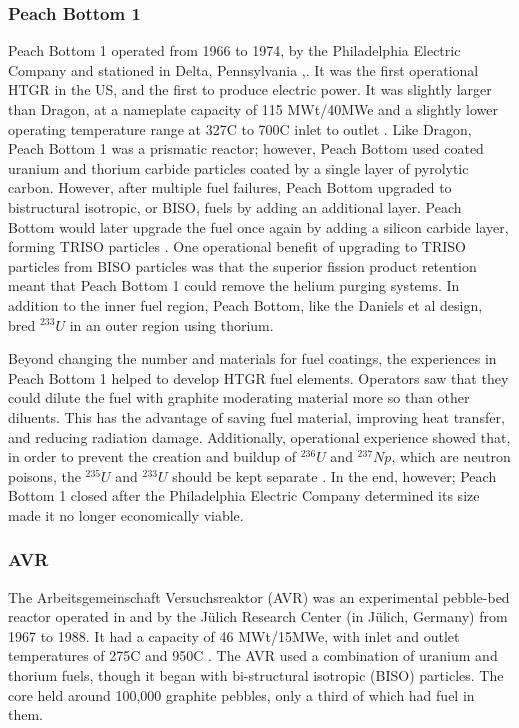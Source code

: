 \subsubsection{Peach Bottom 1}

Peach Bottom 1 operated from 1966 to 1974, by the Philadelphia Electric Company and stationed in Delta, Pennsylvania \cite{beck_high_nodate},\cite{noauthor_peach_nodate}.  It was the first operational HTGR in the US, and the first to produce electric power.  It was slightly larger than Dragon, at a nameplate capacity of 115 MWt/40MWe and a slightly lower operating temperature range at 327\textdegree  C to 700\textdegree  C inlet to outlet \cite{beck_high_nodate}.  Like Dragon, Peach Bottom 1 was a prismatic reactor; however, Peach Bottom used coated uranium and thorium carbide particles coated by a single layer of pyrolytic carbon.  However, after multiple fuel failures, Peach Bottom upgraded to bistructural isotropic, or BISO, fuels by adding an additional layer.  Peach Bottom would later upgrade the fuel once again by adding a silicon carbide layer, forming TRISO particles \cite{beck_high_nodate}.  One operational benefit of upgrading to TRISO particles from BISO particles was that the superior fission product retention meant that Peach Bottom 1 could remove the helium purging systems.  In addition to the inner fuel region, Peach Bottom, like the Daniels et al design, bred $^{233}U$ in an outer region using thorium.

Beyond changing the number and materials for fuel coatings, the experiences in Peach Bottom 1 helped to develop HTGR fuel elements.  Operators saw that they could dilute the fuel with graphite moderating material more so than other diluents.  This has the advantage of saving fuel material, improving heat transfer, and reducing radiation damage.  Additionally, operational experience showed that, in order to prevent the creation and buildup of $^{236}U$ and $^{237}Np$, which are neutron poisons, the $^{235}U$ and $^{233}U$ should be kept separate \cite{simnad_early_1991}.  In the end, however; Peach Bottom 1 closed after the Philadelphia Electric Company determined its size made it no longer economically viable.

\subsubsection{AVR}

The Arbeitsgemeinschaft Versuchsreaktor (AVR) was an experimental pebble-bed reactor operated in and by the Jülich Research Center (in Jülich, Germany) from 1967 to 1988.  It had a capacity of 46 MWt/15MWe, with inlet and outlet temperatures of 275\textdegree  C and 950\textdegree  C \cite{beck_high_nodate}.  The AVR used a combination of uranium and thorium fuels, though it began with bi-structural isotropic (BISO) particles.  The core held around 100,000 graphite pebbles, only a third of which had fuel in them.

